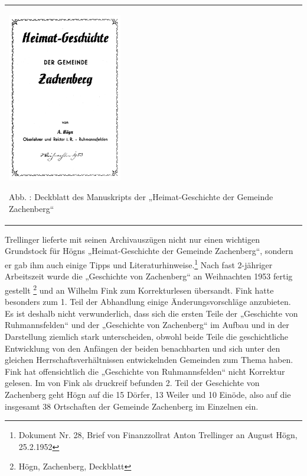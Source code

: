 \documentclass[a4paper]{article}
\newcounter{Abb}
\renewcommand\theAbb{\arabic{Abb}}
\begin{document}
\begin{center}
\begin{minipage}{5.378cm}
\begin{flushleft}
\tablefirsthead{}
\tablehead{}
\tabletail{}
\tablelasttail{}
\begin{supertabular}{m{5.178cm}}

\includegraphics[width=4.995cm,height=7.405cm]{pictures/zulassungsarbeit-img043.png}

Abb. \stepcounter{Abb}{\theAbb}: Deckblatt des Manuskripts der
„Heimat-Geschichte der Gemeinde Zachenberg“\\
\end{supertabular}
\end{flushleft}
\end{minipage}
\end{center}
Trellinger lieferte mit seinen Archivauszügen nicht nur einen wichtigen
Grundstock für Högns „Heimat-Geschichte der Gemeinde Zachenberg“,
sondern er gab ihm auch einige Tipps und Literaturhinweise.\footnote{
Dokument Nr. 28, Brief von Finanzzollrat Anton Trellinger an August
Högn, 25.2.1952} Nach fast 2-jähriger Arbeitszeit wurde die „Geschichte
von Zachenberg“ an Weihnachten 1953 fertig gestellt \footnote{Högn,
Zachenberg, Deckblatt} und an Wilhelm Fink zum Korrekturlesen
übersandt. Fink hatte besonders zum 1. Teil der Abhandlung einige
Änderungsvorschläge anzubieten. Es ist deshalb nicht verwunderlich,
dass sich die ersten Teile der „Geschichte von Ruhmannsfelden“ und der
„Geschichte von Zachenberg“ im Aufbau und in der Darstellung ziemlich
stark unterscheiden, obwohl beide Teile die geschichtliche Entwicklung
von den Anfängen der beiden benachbarten und sich unter den gleichen
Herrschaftsverhältnissen entwickelnden Gemeinden zum Thema haben. Fink
hat offensichtlich die „Geschichte von Ruhmannsfelden“ nicht Korrektur
gelesen. Im von Fink als druckreif befunden 2. Teil der Geschichte von
Zachenberg geht Högn auf die 15 Dörfer, 13 Weiler und 10 Einöde, also
auf die insgesamt 38 Ortschaften der Gemeinde Zachenberg im Einzelnen
ein.
\end{document}
